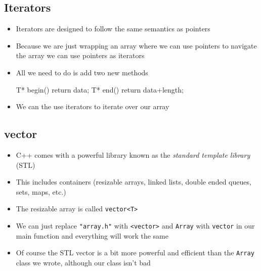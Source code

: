 \begin{slide}
\section{Iterators}

\begin{PauseHighLight}
  \begin{itemize}
  \item Iterators are designed to follow the same semantics as
    pointers
  \item Because we are just wrapping an array where we can use
    pointers to navigate the array we can use pointers as iterators
  \item All we need to do is add two new methods
    \begin{cpp}
        T* begin() {return data;}
        T* end() {return data+length;}
    \end{cpp}
  \item We can the use iterators to iterate over our array
  \end{itemize}
\end{PauseHighLight}

\end{slide}



\begin{slide}
\section{vector}

\begin{itemize}
\item C++ comes with a powerful library known as the \emph{standard
    template library} (STL)
\item This includes containers (resizable arrays, linked lists, double
  ended queues, sets, maps, etc.)
\item The resizable array is called \texttt{vector<T>}
\item We can just replace \texttt{"array.h"} with \texttt{<vector>}
  and \texttt{Array} with \texttt{vector} in our main function and
  everything will work the same
\item Of course the STL vector is a bit more powerful and efficient
  than the \texttt{Array} class we wrote, although our class isn't bad
\end{itemize}

\end{slide}

